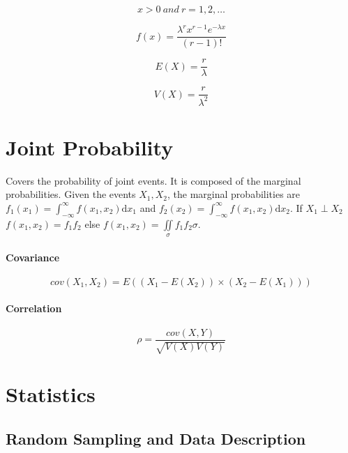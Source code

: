 \documentclass[12pt]{article}
\begin{document}
		\begin{equation*}
		x>0 ~and~ r=1,2,\ldots
		\end{equation*}
		
		\begin{equation*}
		f(x)=\frac{\lambda ^r x^{r-1} e^{-\lambda x}}{(r-1)!}
		\end{equation*}
		
		\begin{equation*}
		E(X)=\frac{r}{\lambda}
		\end{equation*}
		
		\begin{equation*}
		V(X)=\frac{r}{\lambda ^2}
		\end{equation*}
	
	\newpage	
	\section{Joint Probability}
	
	Covers the probability of joint events. It is composed of the marginal probabilities. Given the events \(X_1,X_2\), the marginal probabilities are \(f_1(x_1)=\int_{-\infty}^{\infty}f(x_1, x_2)\mathrm{d} x_1\) and \(f_2(x_2)=\int_{-\infty}^{\infty}f(x_1, x_2)\mathrm{d} x_2\). If \(X_1\perp X_2\) \(f(x_1,x_2)=f_1f_2\) else \(f(x_1,x_2)=\iint\limits_\sigma f_1f_2\sigma \).
	
	\paragraph{Covariance}
	
	\begin{equation*}
		cov(X_1, X_2)=E((X_1-E(X_2))\times(X_2-E(X_1)))
	\end{equation*}
	
	\paragraph{Correlation}
	
	\begin{equation*}
		\rho =\frac{cov(X,Y)}{\sqrt{V(X)V(Y)}}
	\end{equation*}
	
	\newpage
	\section{Statistics}
	
	\subsection{Random Sampling and Data Description}
	
\end{document}
